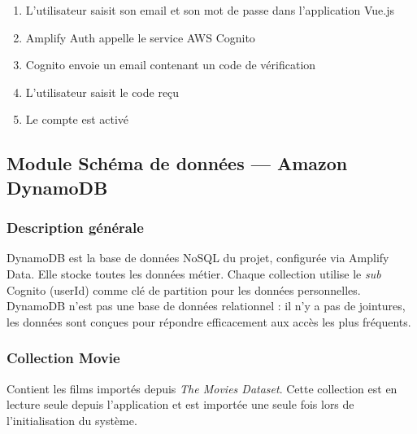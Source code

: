 \documentclass[a4paper,12pt]{report}
\begin{document}
\begin{enumerate}
\item L'utilisateur saisit son email et son mot de passe dans l'application Vue.js
\item Amplify Auth appelle le service AWS Cognito
\item Cognito envoie un email contenant un code de vérification
\item L'utilisateur saisit le code reçu
\item Le compte est activé
\end{enumerate}

 
\subsection{Module Schéma de données — Amazon DynamoDB}
\label{dyna}
\subsubsection{Description générale}

DynamoDB est la base de données NoSQL du projet, configurée via Amplify Data. Elle stocke toutes les données métier. Chaque collection utilise le \textit{sub} Cognito (userId) comme clé de partition pour les données personnelles. DynamoDB n'est pas une base de données relationnel : il n'y a pas de jointures, les données sont conçues pour répondre efficacement aux accès les plus fréquents.

\subsubsection{Collection Movie}

Contient les films importés depuis \textit{The Movies Dataset}. Cette collection est en lecture seule depuis l'application et est importée une seule fois lors de l'initialisation du système.
\end{document}
